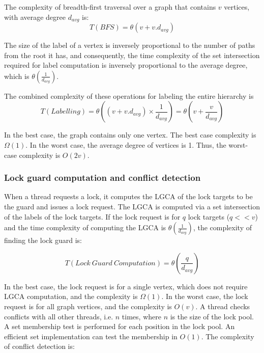 The complexity of breadth-first traversal over a graph that contains $v$ vertices, with average degree $d_{avg}$ is:
\begin{equation*}
	T(\mathit{BFS}) =\theta(v + v.d_{avg}) 
\end{equation*}

The size of the label of a vertex is inversely proportional to the number of paths from the root it has, and consequently, the time complexity of the set intersection required for label computation is inversely proportional to the average degree, which is $\theta(\frac{1}{d_{avg}})$. 


The combined complexity of these operations for labeling the entire hierarchy is 
\begin{equation*}
T(Labelling) = 	\theta((v + v.d_{avg}) \times {\frac{1}{d_{avg}}}) = \theta(v+ \frac{v}{d_{avg}})
\end{equation*}


In the best case, the graph contains only one vertex. The best case complexity is $\Omega(1)$.
In the worst case, the average degree of vertices is 1. Thus, the worst-case complexity is $O(2v)$.


\subsubsection{Lock guard computation and conflict detection}

When a thread requests a lock, it computes the LGCA of the lock targets to be the guard and issues a lock request. 
The LGCA is computed via a set intersection of the labels of the lock targets. 
If the lock request is for $q$ lock targets ($q << v$) and the time complexity of computing the LGCA is $\theta(\frac{1}{d_{avg}})$, the complexity of finding the lock guard is:

\begin{equation*}
	T(Lock~Guard~Computation) = \theta(\frac{q}{d_{avg}})
\end{equation*}



In the best case, the lock request is for a single vertex, which does not require LGCA computation, and the complexity is $\Omega(1)$. In the worst case, the lock request is for all graph vertices, and the complexity is $O(v)$. A thread checks conflicts with all other threads, i.e. $n$ times, where $n$ is the size of the lock pool. A set membership test is performed for each position in the lock pool. An efficient set implementation can test the membership in $O(1)$. The complexity of conflict detection is:
 
